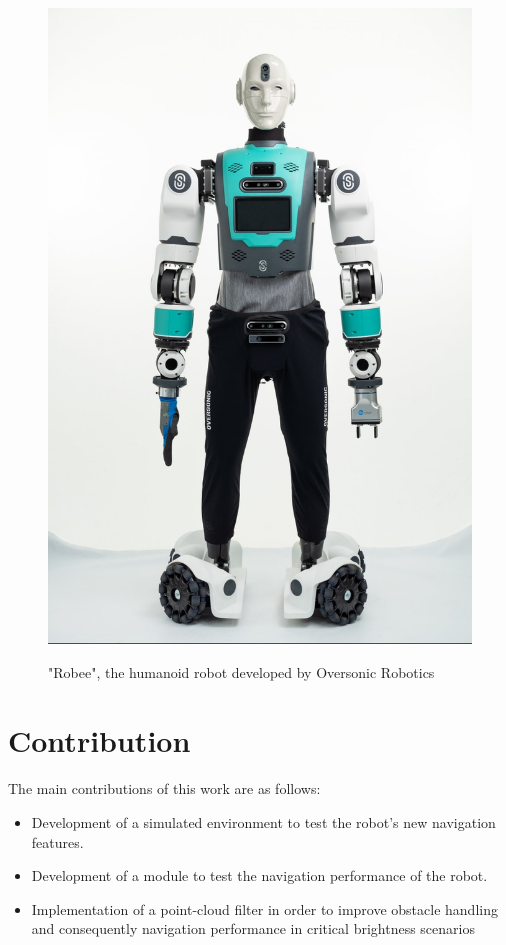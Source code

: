 \begin{figure}[H]
    \centering
    \includegraphics[scale=0.25]{Images/Chapter 1/robee_frontale.jpg}
    \caption{"Robee", the humanoid robot developed by Oversonic Robotics}
    \label{fig:robee}
    \citet{robeeimg}
\end{figure}
\section{Contribution}
The main contributions of this work are as follows:
\begin{itemize}
    \item Development of a simulated environment to test the robot's new navigation features. 
    \item Development of a module to test the navigation performance of the robot.
    \item Implementation of a point-cloud filter in order to improve obstacle handling and consequently navigation performance in critical brightness scenarios
\end{itemize}

